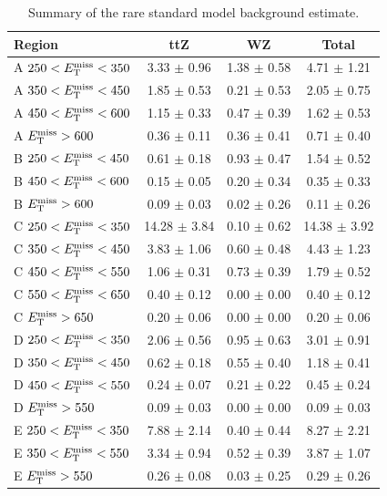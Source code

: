 \begin{table}[htbp]
\centering
\caption{Summary of the rare standard model background
  estimate.}
\label{tab:stop:rarebkg:results}
\begin{tabular}{|l|cc|c|}
\hline
Region & ttZ & WZ & Total  \\
\hline
 A $250<E_\text{T}^\text{miss}<350$ & 3.33 $\pm$ 0.96   & 1.38 $\pm$ 0.58   & 4.71 $\pm$ 1.21   \\
 A $350<E_\text{T}^\text{miss}<450$ & 1.85 $\pm$ 0.53   & 0.21 $\pm$ 0.53   & 2.05 $\pm$ 0.75   \\
 A $450<E_\text{T}^\text{miss}<600$ & 1.15 $\pm$ 0.33   & 0.47 $\pm$ 0.39   & 1.62 $\pm$ 0.53   \\
 A $E_\text{T}^\text{miss}>600$ & 0.36 $\pm$ 0.11   & 0.36 $\pm$ 0.41   & 0.71 $\pm$ 0.40   \\
 B $250<E_\text{T}^\text{miss}<450$ & 0.61 $\pm$ 0.18   & 0.93 $\pm$ 0.47   & 1.54 $\pm$ 0.52   \\
 B $450<E_\text{T}^\text{miss}<600$ & 0.15 $\pm$ 0.05   & 0.20 $\pm$ 0.34   & 0.35 $\pm$ 0.33   \\
 B $E_\text{T}^\text{miss}>600$ & 0.09 $\pm$ 0.03   & 0.02 $\pm$ 0.26   & 0.11 $\pm$ 0.26   \\
 C $250<E_\text{T}^\text{miss}<350$ & 14.28 $\pm$ 3.84  & 0.10 $\pm$ 0.62   & 14.38 $\pm$ 3.92  \\
 C $350<E_\text{T}^\text{miss}<450$ & 3.83 $\pm$ 1.06   & 0.60 $\pm$ 0.48   & 4.43 $\pm$ 1.23   \\
 C $450<E_\text{T}^\text{miss}<550$ & 1.06 $\pm$ 0.31   & 0.73 $\pm$ 0.39   & 1.79 $\pm$ 0.52   \\
 C $550<E_\text{T}^\text{miss}<650$ & 0.40 $\pm$ 0.12   & 0.00 $\pm$ 0.00   & 0.40 $\pm$ 0.12   \\
 C $E_\text{T}^\text{miss}>650$ & 0.20 $\pm$ 0.06   & 0.00 $\pm$ 0.00   & 0.20 $\pm$ 0.06   \\
 D $250<E_\text{T}^\text{miss}<350$ & 2.06 $\pm$ 0.56   & 0.95 $\pm$ 0.63   & 3.01 $\pm$ 0.91   \\
 D $350<E_\text{T}^\text{miss}<450$ & 0.62 $\pm$ 0.18   & 0.55 $\pm$ 0.40   & 1.18 $\pm$ 0.41   \\
 D $450<E_\text{T}^\text{miss}<550$ & 0.24 $\pm$ 0.07   & 0.21 $\pm$ 0.22   & 0.45 $\pm$ 0.24   \\
 D $E_\text{T}^\text{miss}>550$ & 0.09 $\pm$ 0.03   & 0.00 $\pm$ 0.00   & 0.09 $\pm$ 0.03   \\
 E $250<E_\text{T}^\text{miss}<350$ & 7.88 $\pm$ 2.14   & 0.40 $\pm$ 0.44   & 8.27 $\pm$ 2.21   \\
 E $350<E_\text{T}^\text{miss}<550$ & 3.34 $\pm$ 0.94   & 0.52 $\pm$ 0.39   & 3.87 $\pm$ 1.07   \\
 E $E_\text{T}^\text{miss}>550$ & 0.26 $\pm$ 0.08   & 0.03 $\pm$ 0.25   & 0.29 $\pm$ 0.26   \\

\end{tabular}
\end{table}
